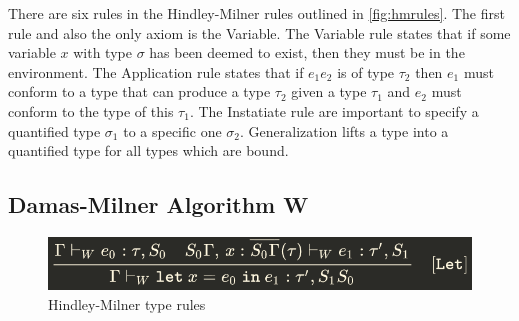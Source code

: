 \documentclass[11pt,oneside,a4paper]{report}
\begin{document}
There are six rules in the Hindley-Milner rules outlined in \autoref{fig:hmrules}.
The first rule and also the only axiom is the Variable.
The Variable rule states that if some variable $x$ with type $\sigma$ has been deemed to exist, then they must be in the environment.
The Application rule states that if $e_1 e_2$ is of type $\tau_2$ then $e_1$ must conform to a type that can produce a type $\tau_2$ given a type $\tau_1$ and $e_2$ must conform to the type of this $\tau_1$.
The Instatiate rule are important to specify a quantified type $\sigma_1$ to a specific one $\sigma_2$.
Generalization lifts a type into a quantified type for all types which are bound.

\subsection{Damas-Milner Algorithm W}
\begin{figure}[ht]
\begin{mdframed}

    \begin{prooftree}
    \end{prooftree}
    \endminipage\hfill
    \begin{prooftree}
    \end{prooftree}
    \endminipage\hfill\vspace{0.8cm}

    \begin{prooftree}
    \end{prooftree}
    \endminipage\hfill\vspace{0.8cm}

        \includegraphics[width=1\textwidth]{let}
    \endminipage
\end{mdframed}
\caption{Hindley-Milner type rules}
\label{fig:hmrules}
\end{figure}
\end{document}
